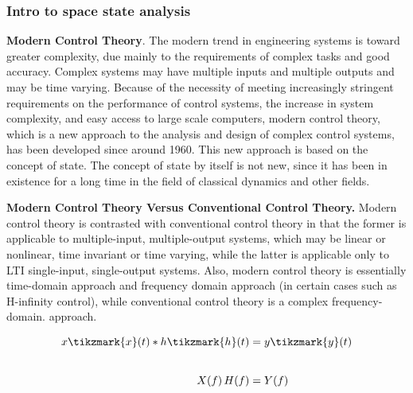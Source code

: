 \documentclass{beamer}
\begin{document}
\begin{frame}[allowframebreaks]
\frametitle{Intro to space state analysis}

\textbf{Modern Control Theory}. The modern trend in engineering systems is toward
greater complexity, due mainly to the requirements of complex tasks and good accuracy.
\medskip
\noindent
 Complex systems may have multiple inputs and multiple outputs and may be time
varying. 
\medskip
\noindent
Because of the necessity of meeting increasingly stringent requirements on
the performance of control systems, the increase in system complexity, and easy access
to large scale computers, modern control theory, which is a new approach to the analysis and design of complex control systems, has been developed since around 1960.
\medskip
\noindent
This new approach is based on the concept of state. The concept of state by itself is not
new, since it has been in existence for a long time in the field of classical dynamics and
other fields.

\medskip
\noindent
\textbf{Modern Control Theory Versus Conventional Control Theory.}
 Modern control theory is contrasted with conventional control theory in that the former is applicable to multiple-input, multiple-output systems, which may be linear or nonlinear,
time invariant or time varying, while the latter is applicable only to \gls{LTI} single-input, single-output systems.
\medskip
\noindent
 Also, modern control theory is essentially time-domain approach and frequency domain approach (in certain cases such as
H-infinity control), while conventional control theory is a complex frequency-domain.
approach. 

\begin{align*}
x\tikzmark{x}(t)*h\tikzmark{h}(t) &= y\tikzmark{y}(t) \\[2em]
X(f) \, H(f) &= Y(f) 
\end{align*}

\end{frame}

\end{document}
